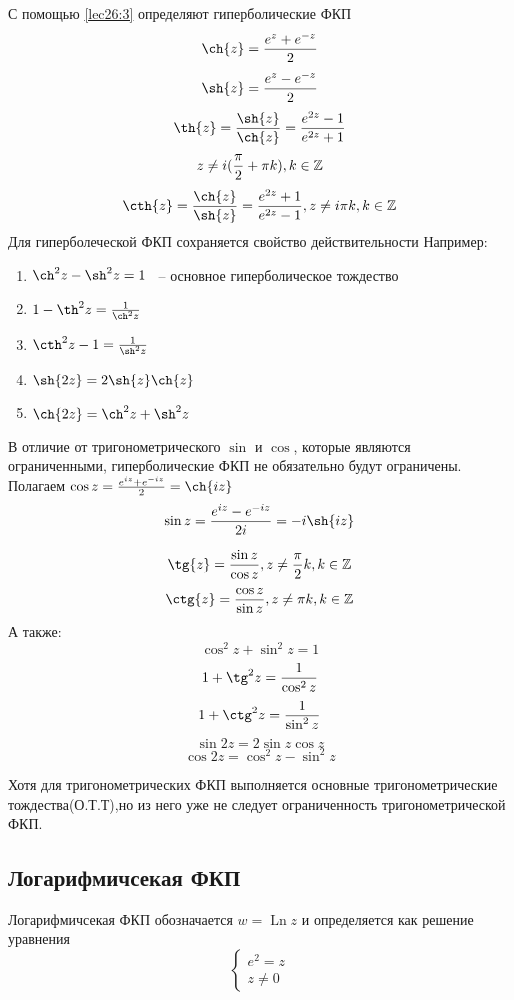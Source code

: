 \documentclass[../../main.tex]{subfiles}
\begin{document}
С помощью \eqref{lec26:3} определяют гиперболические ФКП
\[
 \ch{z} = \frac{e^z + e^{-z}}{2}
\]
\[
 \sh{z} = \frac{e^z - e^{-z}}{2}
\]
\[
 \th{z} = \frac{\sh{z}}{\ch{z}} = \frac{e^{2z} - 1}{e^{2z} + 1}
\]
\[
 z \neq i(\frac{\pi}{2} + \pi k), k \in \mathbb{Z}
\]
\[
 \cth{z} = \frac{\ch{z}}{\sh{z}} =
 \frac{e^{2z} + 1}{e^{2z} - 1}, z \neq i \pi k, k \in \Z
\]
Для гиперболеческой ФКП сохраняется свойство действительности
Например:
\begin{enumerate}
 \item $\ch^{2}{z} - \sh^{2}{z} = 1$  ~-- основное гиперболическое тождество
 \item $1 - \th^{2}{z} = \frac{1}{\ch^{2}{z}}$
 \item $\cth^{2}{z} - 1= \frac{1}{\sh^{2}{z}}$
 \item $\sh{2z} = 2\sh{z} \ch{z}$
 \item $\ch{2z} = \ch^{2}{z} + \sh^{2}{z}$
\end{enumerate}

В отличие от тригонометрического $\sin$ и $\cos$, которые являются 
ограниченными, гиперболические ФКП не обязательно будут ограничены.\\
Полагаем $\cos{z} = \frac{e^{iz} + e^{-iz}}{2} = \ch{iz}$
\[
 \sin{z} = \frac{e^{iz} - e^{-iz}}{2i} = -i \sh{iz}
\]

\[
 \tg{z} = \frac{\sin{z}}{\cos{z}}, z \neq \frac{\pi}{2} k, k \in \Z
\]
\[
 \ctg{z} = \frac{\cos{z}}{\sin{z}}, z \neq \pi k, k \in \Z
\]
А также:
\[
 \cos^2{z} + \sin^2{z} = 1
\]
\[
 1 + \tg^{2}{z} = \frac{1}{\cos^2{z}}
\]
\[
 1 + \ctg^{2}{z} = \frac{1}{\sin^2{z}}
\]
\[
 \sin{2z} = 2 \sin{z} \cos{z}
\]
\[
 \cos{2z} = \cos^{2}{z} -  \sin^{2}{z}
\]

Хотя для тригонометрических ФКП выполняется основные тригонометрические
тождества(О.Т.Т),но из него уже не следует ограниченность 
тригонометрической ФКП.

\subsection{Логарифмичсекая ФКП}
Логарифмичсекая ФКП обозначается $w = \operatorname{Ln}{z}$ 
и определяется как решение уравнения 
\begin{equation}
 \label{lec26;4}
 \begin{cases}
   e^{2} = z \\
   z \neq 0
 \end{cases}
\end{equation}

 
\end{document}
